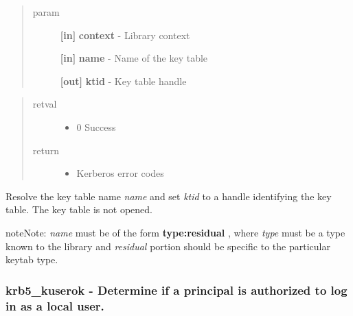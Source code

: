 \documentclass[letterpaper,10pt,english]{sphinxmanual}
\begin{document}
\begin{quote}\begin{description}
\item[{param}] \leavevmode
\textbf{{[}in{]}} \textbf{context} - Library context

\textbf{{[}in{]}} \textbf{name} - Name of the key table

\textbf{{[}out{]}} \textbf{ktid} - Key table handle

\end{description}\end{quote}
\begin{quote}\begin{description}
\item[{retval}] \leavevmode\begin{itemize}
\item {} 
0   Success

\end{itemize}

\item[{return}] \leavevmode\begin{itemize}
\item {} 
Kerberos error codes

\end{itemize}

\end{description}\end{quote}

Resolve the key table name \emph{name} and set \emph{ktid} to a handle identifying the key table. The key table is not opened.

\begin{notice}{note}{Note:}
\emph{name} must be of the form \textbf{type:residual} , where \emph{type} must be a type known to the library and \emph{residual} portion should be specific to the particular keytab type.
\end{notice}


\subsubsection{krb5\_kuserok -  Determine if a principal is authorized to log in as a local user.}
\label{appdev/refs/api/krb5_kuserok:krb5-kuserok-determine-if-a-principal-is-authorized-to-log-in-as-a-local-user}\label{appdev/refs/api/krb5_kuserok::doc}

\begin{fulllineitems}
\label{appdev/refs/api/krb5_kuserok:krb5_kuserok}
\end{fulllineitems}
\end{document}
